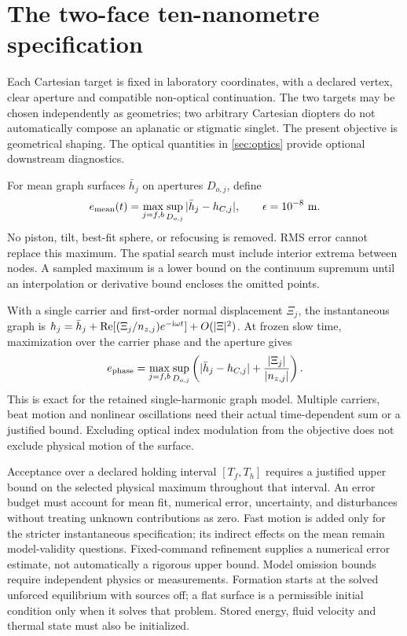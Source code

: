 \section{The two-face ten-nanometre specification}
\label{sec:accuracy}

Each Cartesian target is fixed in laboratory coordinates, with a declared
vertex, clear aperture and compatible non-optical continuation. The two
targets may be chosen independently as geometries; two arbitrary Cartesian
diopters do not automatically compose an aplanatic or stigmatic singlet.
The present objective is geometrical shaping. The optical quantities in
\cref{sec:optics} provide optional downstream diagnostics.

For mean graph surfaces $\bar h_j$ on apertures $D_{o,j}$, define
\begin{equation}
 e_{\rm mean}(t)=\max_{j=f,b}\sup_{D_{o,j}}|\bar h_j-h_{C,j}|,
 \qquad
 \epsilon=10^{-8}\ \mathrm m.
 \label{eq:mean-maximum-spec}
\end{equation}
No piston, tilt, best-fit sphere, or refocusing is removed. RMS error cannot
replace this maximum. The spatial search must include interior extrema between
nodes. A sampled maximum is a lower bound on the continuum supremum until an
interpolation or derivative bound encloses the omitted points.

With a single carrier and first-order normal displacement $\Xi_j$, the
instantaneous graph is
$h_j=\bar h_j+\operatorname{Re}[(\Xi_j/n_{z,j})e^{-\mathrm i\omega t}]+O(|\Xi|^2)$.
At frozen slow time, maximization over the carrier phase and the aperture gives
\begin{equation}
 e_{\rm phase}=\max_{j=f,b}\sup_{D_{o,j}}
          \left(|\bar h_j-h_{C,j}|+\frac{|\Xi_j|}{|n_{z,j}|}\right).
 \label{eq:instantaneous-maximum-spec}
\end{equation}
This is exact for the retained single-harmonic graph model. Multiple carriers,
beat motion and nonlinear oscillations need their actual time-dependent sum
or a justified bound. Excluding optical index modulation from the objective
does not exclude physical motion of the surface.

Acceptance over a declared holding interval $[T_f,T_h]$ requires a justified
upper bound on the selected physical maximum throughout that interval. An error budget
must account for mean fit, numerical error, uncertainty, and
disturbances without treating unknown contributions as zero. Fast motion is
added only for the stricter instantaneous specification; its indirect effects
on the mean remain model-validity questions. Fixed-command
refinement supplies a numerical error estimate, not automatically a rigorous
upper bound. Model omission bounds require independent physics or measurements.
Formation starts at the solved unforced equilibrium with sources off; a flat
surface is a permissible initial condition only when it solves that problem.
Stored energy, fluid velocity and thermal state must also be initialized.

